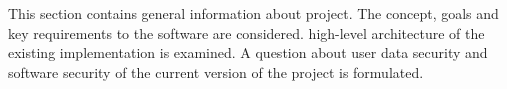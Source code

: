 %
%
This section contains general information about  project. 
%
The concept, goals and key requirements to the software are considered. 
%
 high-level architecture of the existing  implementation is examined. 
%
A question about user data security and software security of the current version of the project is formulated. 